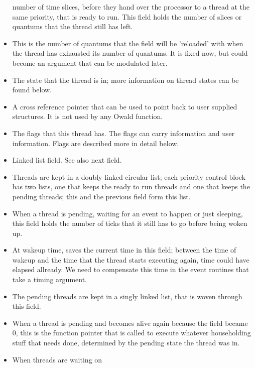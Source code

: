 \begin{itemize}
number of time slices, before they hand over the processor to a thread at
the same priority, that is ready to run. This field holds the number of
slices or quantums that the thread still has left.
\item {} This is the number of
quantums that the  field will be 'reloaded' with when
the thread has exhausted its
number of quantums. It is fixed now, but could become an argument that can
be modulated later.
\item {} The state that the thread is in;
more information on thread states can be found below.
\item {} A cross reference pointer that can
be used to point back to user supplied structures. It is not used by any
Owald function.
\item {} The flags that this thread has.
The flags can carry \oswald information and user information. Flags are
described more in detail below.
\item {} Linked list field. See also next
field.
\item {} Threads are kept in a doubly
linked circular list; each priority control block has two lists, one that
keeps the ready to run threads and one that keeps the pending threads; 
this and the previous field form this list.
\item {} When a thread is pending,
waiting for an event to happen or just sleeping, this field holds the number
of ticks that it still has to go before being woken up.
\item {} At wakeup time, \oswald saves the
current time in this field; between the time of wakeup and the time
that the thread starts executing again, time could have elapsed allready. We
need to compensate this time in the event routines that take a timing
argument.
\item {} The pending threads are kept in a
singly linked list, that is woven through this field.
\item {} When a thread is pending and
becomes alive again because the  field became 0, this is the
function pointer that is called to execute whatever householding stuff that
needs done, determined by the pending state the thread was in.
\item {} When threads are waiting on

\end{itemize}

